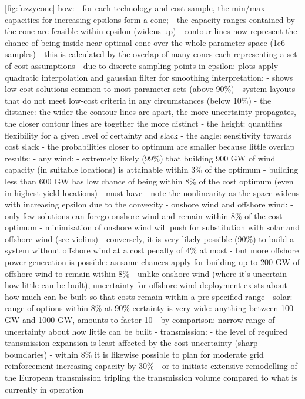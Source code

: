 \cref{fig:fuzzycone}
how:
- for each technology and cost sample, the min/max capacities for increasing epsilons form a cone; 
- the capacity ranges contained by the cone are feasible within epsilon (widens up)
- contour lines now represent the chance of being inside near-optimal cone over the whole parameter space (1e6 samples)
- this is calculated by the overlap of many cones each representing a set of cost assumptions
- due to discrete sampling points in epsilon: plots apply quadratic interpolation and gaussian filter for smoothing
interpretation:
- shows low-cost solutions common to most parameter sets (above 90\%)
- system layouts that do not meet low-cost criteria in any circumstances (below 10\%)
- the distance: the wider the contour lines are apart, the more uncertainty propagates, the closer contour lines are together the more distinct
- the height: quantifies flexibility for a given level of certainty and slack
- the angle: sensitivity towards cost slack
- the probabilities closer to optimum are smaller because little overlap
results:
- any wind:
  - extremely likely (99\%) that building 900 GW of wind capacity (in suitable locations) is attainable within 3\% of the optimum
  - building less than 600 GW has low chance of being within 8\% of the cost optimum (even in highest yield locations) - must have
  - note the nonlinearity as the space widens with increasing epsilon due to the convexity
- onshore wind and offshore wind:
  - only few solutions can forego onshore wind and remain within 8\% of the cost-optimum
  - minimisation of onshore wind will push for substitution with solar and offshore wind (see violins)
  - conversely, it is very likely possible (90\%) to build a system without offshore wind at a cost penalty of 4\% at most
  - but more offshore power generation is possible: as same chances apply for building up to 200 GW of offshore wind to remain within 8\% 
  - unlike onshore wind (where it's uncertain how little can be built), uncertainty for offshore wind deployment exists about how much can be built so that costs remain within a pre-specified range
- solar:
  - range of options within 8\% at 90\% certainty is very wide: anything between 100 GW and 1000 GW, amounts to factor 10
  - by comparison: narrow range of uncertainty about how little can be built
- transmission: 
  - the level of required transmission expansion is least affected by the cost uncertainty (sharp boundaries)
  - within 8\% it is likewise possible to plan for moderate grid reinforcement increasing capacity by 30\%
  - or to initiate extensive remodelling of the European transmission tripling the transmission volume compared to what is currently in operation

